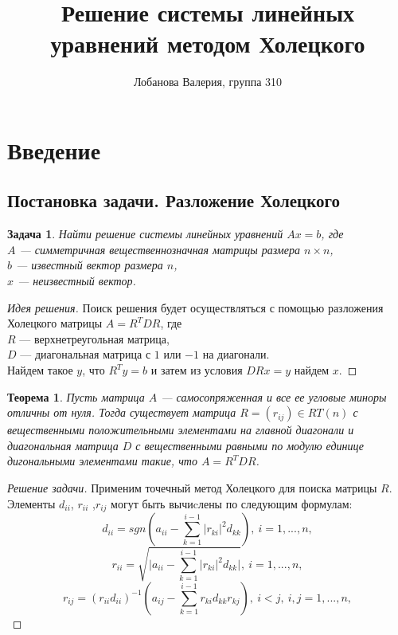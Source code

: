 \documentclass[a4paper,12pt]{article}
\title{\textbf{Решение системы линейных уравнений методом Холецкого}}
\author{Лобанова Валерия, группа 310}
\date{ }
\newtheorem*{task*}{Задача}
\newtheorem*{theorem*}{Теорема}
\begin{document}
\maketitle
\thispagestyle{empty} 
\newpage
\tableofcontents{}



\newpage
\section{Введение}
\subsection{Постановка задачи. Разложение Холецкого}
    \begin{task*}
        Найти решение системы линейных уравнений $A x=b$, где \\
        $A $ --- симметричная вещественнозначная матрицы размера $n \times n$, \\
        $b$ --- известный вектор размера $n$, \\
        $x$ --- неизвестный вектор.
    \end{task*}
    
    \begin{proof} [Идея решения]
        Поиск решения будет осуществляться с помощью разложения 
        Холецкого матрицы $A=R^T DR$,  где \\
        $R$ --- верхнетреугольная матрица, \\
        $D$ --- диагональная матрица с $1$ или $-1$  на диагонали.\\
        Найдем такое $y$, что $R^Ty=b$ и затем из условия $DRx=y$ найдем $x$.
    \end{proof}
    
    \begin{theorem*}
        Пусть матрица $A$ --- самосопряженная и все ее угловые миноры отличны
        от нуля. Тогда существует матрица $R=(r_{ij}) \in RT(n)$  с вещественными 
        положительными элементами на главной диагонали и диагональная матрица
        $D$ с вещественными равными по модулю единице дигональными элементами
        такие, что $A=R^T DR$.
    \end{theorem*}
    
    \begin{proof} [Решение задачи]
        Применим точечный метод Холецкого для поиска матрицы $R$.
        Элементы $d_{ii}$, $r_{ii}$ ,$r_{ij}$ могут быть вычиcлены по 
        следующим формулам:
        \begin{equation} \label{dot}
             d_{ii} = sgn(a_{ii}-\sum_{k=1}^{i-1}|r_{ki}|^2d_{kk}),\  i=1,...,n,
        \end{equation}
        $$ 
            r_{ii} = \sqrt{\Big|a_{ii}-\sum_{k=1}^{i-1}|r_{ki}|^2d_{kk}\Big|},\  i=1,...,n, 
        $$
        $$ 
            r_{ij} = (r_{ii}d_{ii})^{-1}
                    (a_{ij}-\sum_{k=1}^{i-1}r_{ki}d_{kk}r_{kj}),\  
                    i<j, \ i,j=1,...,n,
        $$
    \end{proof}
\end{document}
